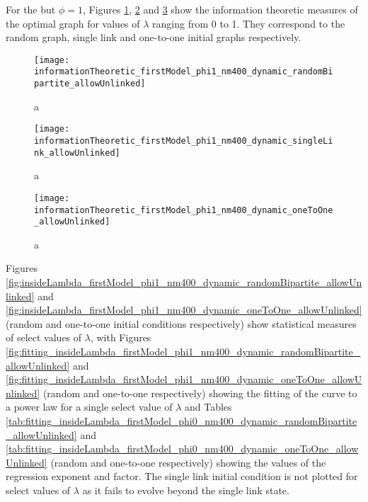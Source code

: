 


For the \firstmodel{} but $\phi=1$, Figures  \ref{fig:informationTheoretic_firstModel_phi1_nm400_dynamic_randomBipartite_allowUnlinked},  \ref{fig:informationTheoretic_firstModel_phi1_nm400_dynamic_singleLink_allowUnlinked} and  \ref{fig:informationTheoretic_firstModel_phi1_nm400_dynamic_oneToOne_allowUnlinked} show the information theoretic measures of the optimal graph for values of $\lambda$ ranging from 0 to 1.
They correspond to the random graph, single link and one-to-one initial graphs respectively.

\begin{figure}
  \centering
  \texttt{[image: informationTheoretic\_firstModel\_phi1\_nm400\_dynamic\_randomBipartite\_allowUnlinked]}
  \caption{a}
  \label{fig:informationTheoretic_firstModel_phi1_nm400_dynamic_randomBipartite_allowUnlinked}
\end{figure}

\begin{figure}
  \centering
  \texttt{[image: informationTheoretic\_firstModel\_phi1\_nm400\_dynamic\_singleLink\_allowUnlinked]}
  \caption{a}
  \label{fig:informationTheoretic_firstModel_phi1_nm400_dynamic_singleLink_allowUnlinked}
\end{figure}

\begin{figure}
  \centering
  \texttt{[image: informationTheoretic\_firstModel\_phi1\_nm400\_dynamic\_oneToOne\_allowUnlinked]}
  \caption{a}
  \label{fig:informationTheoretic_firstModel_phi1_nm400_dynamic_oneToOne_allowUnlinked}
\end{figure}

Figures \ref{fig:insideLambda_firstModel_phi1_nm400_dynamic_randomBipartite_allowUnlinked} and \ref{fig:insideLambda_firstModel_phi1_nm400_dynamic_oneToOne_allowUnlinked} (random and one-to-one initial conditions respectively) show statistical measures of select values of $\lambda$, with Figures \ref{fig:fitting_insideLambda_firstModel_phi1_nm400_dynamic_randomBipartite_allowUnlinked} and \ref{fig:fitting_insideLambda_firstModel_phi1_nm400_dynamic_oneToOne_allowUnlinked} (random and one-to-one respectively) showing the fitting of the curve to a power law for a single select value of $\lambda$ and Tables \ref{tab:fitting_insideLambda_firstModel_phi0_nm400_dynamic_randomBipartite_allowUnlinked} and \ref{tab:fitting_insideLambda_firstModel_phi0_nm400_dynamic_oneToOne_allowUnlinked} (random and one-to-one respectively) showing the values of the regression exponent and factor.
The single link initial condition is not plotted for select values of $\lambda$ as it fails to evolve beyond the single link state.

